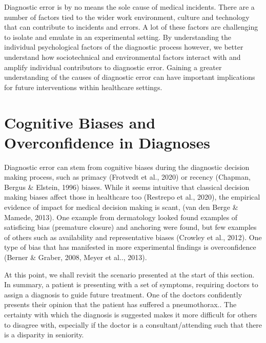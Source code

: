 \documentclass[a4paper, nobind]{templates/ociamthesis}
\begin{document}
Diagnostic error is by no means the sole cause of medical incidents. There are a number of factors tied to the wider work environment, culture and technology that can contribute to incidents and errors. A lot of these factors are challenging to isolate and emulate in an experimental setting. By understanding the individual psychological factors of the diagnostic process however, we better understand how sociotechnical and environmental factors interact with and amplify individual contributors to diagnostic error. Gaining a greater understanding of the causes of diagnostic error can have important implications for future interventions within healthcare settings.

\hypertarget{cognitive-biases-and-overconfidence-in-diagnoses}{%
\section*{Cognitive Biases and Overconfidence in Diagnoses}\label{cognitive-biases-and-overconfidence-in-diagnoses}}

Diagnostic error can stem from cognitive biases during the diagnostic decision making process, such as primacy (Frotvedt et al., 2020) or recency (Chapman, Bergus \& Elstein, 1996) biases. While it seems intuitive that classical decision making biases affect those in healthcare too (Restrepo et al., 2020), the empirical evidence of impact for medical decision making is scant, (van den Berge \& Mamede, 2013). One example from dermatology looked found examples of satisficing bias (premature closure) and anchoring were found, but few examples of others such as availability and representative biases (Crowley et al., 2012). One type of bias that has manifested in more experimental findings is overconfidence (Berner \& Graber, 2008, Meyer et al.., 2013).

At this point, we shall revisit the scenario presented at the start of this section. In summary, a patient is presenting with a set of symptoms, requiring doctors to assign a diagnosis to guide future treatment. One of the doctors confidently presents their opinion that the patient has suffered a pneumothorax.. The certainty with which the diagnosis is suggested makes it more difficult for others to disagree with, especially if the doctor is a consultant/attending such that there is a disparity in seniority.
\end{document}
